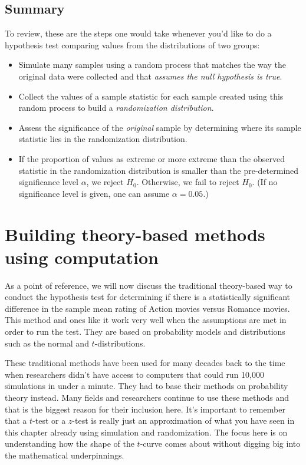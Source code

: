 \documentclass[]{tufte-book}
\begin{document}
\subsection{Summary}\label{summary-5}

To review, these are the steps one would take whenever you'd like to do
a hypothesis test comparing values from the distributions of two groups:

\begin{itemize}
\item
  Simulate many samples using a random process that matches the way the
  original data were collected and that \emph{assumes the null
  hypothesis is true}.
\item
  Collect the values of a sample statistic for each sample created using
  this random process to build a \emph{randomization distribution}.
\item
  Assess the significance of the \emph{original} sample by determining
  where its sample statistic lies in the randomization distribution.
\item
  If the proportion of values as extreme or more extreme than the
  observed statistic in the randomization distribution is smaller than
  the pre-determined significance level \(\alpha\), we reject \(H_0\).
  Otherwise, we fail to reject \(H_0\). (If no significance level is
  given, one can assume \(\alpha = 0.05\).)
\end{itemize}

\section{Building theory-based methods using
computation}\label{theory-hypo}

As a point of reference, we will now discuss the traditional
theory-based way to conduct the hypothesis test for determining if there
is a statistically significant difference in the sample mean rating of
Action movies versus Romance movies. This method and ones like it work
very well when the assumptions are met in order to run the test. They
are based on probability models and distributions such as the normal and
\(t\)-distributions.

These traditional methods have been used for many decades back to the
time when researchers didn't have access to computers that could run
10,000 simulations in under a minute. They had to base their methods on
probability theory instead. Many fields and researchers continue to use
these methods and that is the biggest reason for their inclusion here.
It's important to remember that a \(t\)-test or a \(z\)-test is really
just an approximation of what you have seen in this chapter already
using simulation and randomization. The focus here is on understanding
how the shape of the \(t\)-curve comes about without digging big into
the mathematical underpinnings.
\end{document}
